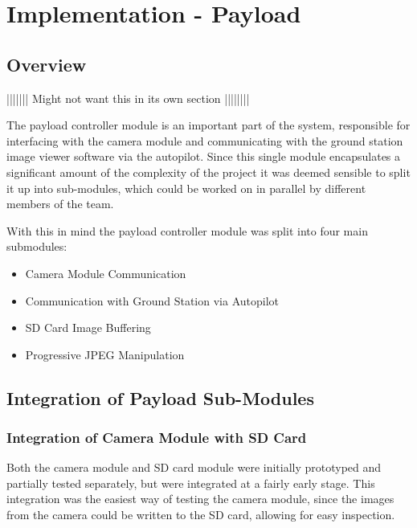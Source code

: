 \chapter{Implementation - Payload}


\section{Overview}
||||||| Might not want this in its own section ||||||||

The payload controller module is an important part of the system, responsible
for interfacing with the camera module and communicating with the ground 
station image viewer software via the autopilot. Since this single module 
encapsulates a significant amount of the complexity of the project it was 
deemed sensible to split it up into sub-modules, which could be worked on in
parallel by different members of the team. 

With this in mind the payload controller module was split into four main 
submodules:

\begin{itemize}
	\item Camera Module Communication
	\item Communication with Ground Station via Autopilot
	\item SD Card Image Buffering
	\item Progressive JPEG Manipulation
\end{itemize}









\section{Integration of Payload Sub-Modules}


\subsection{Integration of Camera Module with SD Card}
Both the camera module and SD card module were initially prototyped and 
partially tested separately,
but were integrated at
a fairly early stage. This integration was the easiest way of testing the 
camera module, since the images from the camera could be written to the SD
card, allowing for easy inspection.

